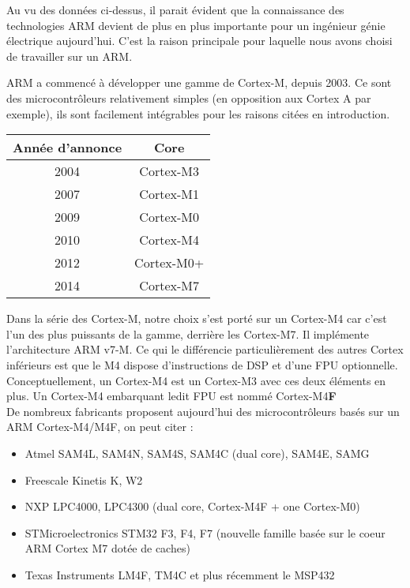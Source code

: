 Au vu des données ci-dessus, il parait évident que la connaissance des technologies ARM devient de plus en plus importante pour un ingénieur génie électrique aujourd'hui. 
C'est la raison principale pour laquelle nous avons choisi de travailler sur un ARM.

ARM a commencé à développer une gamme de Cortex-M, depuis 2003. 
Ce sont des microcontrôleurs relativement simples (en opposition aux Cortex A par exemple), ils sont facilement intégrables pour les raisons citées en introduction. \\
            
\begin{center}
	\begin{tabular}{|c|c|}
		\hline
		Année d'annonce & Core       \\
		\hline
		2004             & Cortex-M3  \\
		2007             & Cortex-M1  \\
		2009             & Cortex-M0  \\
		2010             & Cortex-M4  \\
		2012             & Cortex-M0+ \\
		2014             & Cortex-M7  \\
		\hline
	\end{tabular}
\end{center}
            
Dans la série des Cortex-M, notre choix s'est porté sur un Cortex-M4 car c'est l'un des plus puissants de la gamme, derrière les Cortex-M7.
Il implémente l'architecture ARM v7-M.
Ce qui le différencie particulièrement des autres Cortex inférieurs est que le M4 dispose d'instructions de \gls{DSP} et d'une \gls{FPU} optionnelle.
Conceptuellement, un Cortex-M4 est un Cortex-M3 avec ces deux éléments en plus. Un Cortex-M4 embarquant ledit FPU est nommé Cortex-M4\textbf{F}\\
            
De nombreux fabricants proposent aujourd'hui des microcontrôleurs basés sur un ARM Cortex-M4/M4F, on peut citer :
\begin{itemize}
	\item Atmel SAM4L, SAM4N, SAM4S, SAM4C (dual core), SAM4E, SAMG
	\item Freescale Kinetis K, W2
	\item NXP LPC4000, LPC4300 (dual core, Cortex-M4F + one Cortex-M0)
	\item STMicroelectronics STM32 F3, F4, F7 (nouvelle famille basée sur le coeur ARM Cortex M7 dotée de caches)
	\item Texas Instruments LM4F, TM4C et plus récemment le MSP432
\end{itemize}
            
